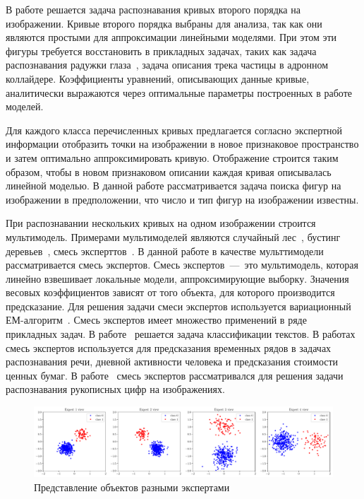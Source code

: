 \documentclass[12pt, twoside]{article}
\numberwithin{equation}{section}
\begin{document}
В работе решается задача распознавания кривых второго порядка на изображении. Кривые второго порядка выбраны для анализа, так как они являются простыми для аппроксимации линейными моделями. При этом эти фигуры требуется восстановить в прикладных задачах, таких как задача распознавания радужки глаза~\cite{Matveev2010, Matveev2014, Bowyer2010}, задача описания трека частицы в адронном коллайдере. Коэффициенты уравнений, описывающих данные кривые, аналитически выражаются через оптимальные параметры построенных в работе моделей.

Для каждого класса перечисленных кривых предлагается согласно экспертной информации отобразить точки на изображении в новое признаковое пространство и затем оптимально аппроксимировать кривую. Отображение строится таким образом, чтобы в новом признаковом описании каждая кривая описывалась линейной моделью. В данной работе рассматривается задача поиска фигур на изображении в предположении, что число и тип фигур на изображении известны.

При распознавании нескольких кривых на одном изображении строится мультимодель. Примерами мультимоделей являются случайный лес~\cite{Ishwaran2012}, бустинг деревьев~\cite{Tianqi2016}, смесь эксперттов~\cite{Yuksel2012}. В данной работе в качестве мульттимодели рассматривается смесь экспертов. Смесь экспертов~---~это мультимодель, которая линейно взвешивает локальные модели, аппроксимирующие выборку. Значения весовых коэффициентов зависят от того объекта, для которого производится предсказание. Для решения задачи смеси экспертов используется вариационный ЕМ-алгоритм~\cite{Dempster1977, bishop2006, Peng1996}. Смесь экспертов имеет множество применений в ряде прикладных задач. В работе~\cite{Estabrooks2001} решается задача классификации текстов. В работах~\cite{Cheung1995, Weigend2000, Cao2003, Mossavat2010, Sminchisescu2007, Tuerk2001, Yumlu2003} смесь экспертов используется для предсказания временных рядов в задачах распознавания речи, дневной активности человека и предсказания стоимости ценных бумаг. В работе~\cite{Ebrahimpour2009} смесь экспертов рассматривался для решения задачи распознавания рукописных цифр на изображениях.

\begin{figure}[h!t]\center
\includegraphics[width=1.0\textwidth]{figures/expert_example}
\caption{Представление объектов разными экспертами}
\label{intro:fig1}
\end{figure}
\end{document}
